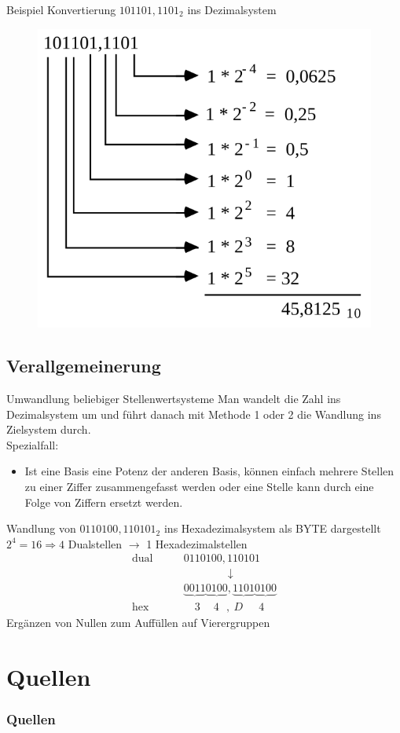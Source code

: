 \documentclass[12pt%
,aspectratio=169%
]{beamer}
\begin{document}
\begin{frame}{Beispiel}
Konvertierung $101101,1101_2$ ins Dezimalsystem
\begin{figure}
\hspace{-1.7cm}
\includegraphics[scale=0.37]{pictures/bin_dec}
\end{figure}
\end{frame}

\subsection{Verallgemeinerung}
\begin{frame}{Umwandlung beliebiger Stellenwertsysteme}
Man wandelt die Zahl ins Dezimalsystem um und führt danach mit Methode 1 oder 2 die Wandlung ins Zielsystem
durch.\\
Spezialfall:
\begin{itemize}
	\item Ist eine Basis eine Potenz der anderen Basis, können einfach mehrere Stellen zu einer Ziffer zusammengefasst werden oder eine Stelle kann durch eine Folge von Ziffern ersetzt werden.
\end{itemize}
Wandlung von $0110100,110101_2$ ins Hexadezimalsystem als BYTE dargestellt
$2^4 = 16 \Rightarrow 4$ Dualstellen $\to$ 1 Hexadezimalstellen
\begin{align*}
\text{dual}\qquad & 0110100,110101 \\
	& \qquad \qquad \downarrow \\
 & \underbrace{0011} \underbrace{0100} , \underbrace{1101} \underbrace{0100}\\
\text{hex}\qquad & \quad 3 \quad~ 4 ~~~, ~ D \quad ~~4
\end{align*}
Ergänzen von Nullen zum Auffüllen auf Vierergruppen
\end{frame}

\section*{Quellen}
\appendix
\begin{frame}[allowframebreaks]
  \frametitle<presentation>{Quellen}
\printbibliography
\end{frame}
\end{document}
